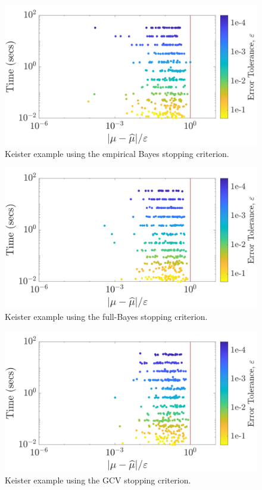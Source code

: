 \documentclass[graybox,footinfo]{svmult}
\begin{document}
\begin{figure}
\centering
\includegraphics[width=0.95\linewidth]{"figures/Sobol/Sobol_Keister_guaranteed_time_MLE__d4_r1_2019-Sep-1"}
\caption[Sobol: Keister guaranteed: MLE]{Keister example using the empirical Bayes stopping criterion.}
\label{fig:Sobol-keister-guaranteed-MLE}
\end{figure}
\begin{figure}
\centering
\includegraphics[width=0.95\linewidth]{"figures/Sobol/Sobol_Keister_guaranteed_time_full__d4_r1_2019-Sep-1"}
\caption[Sobol: Keister guaranteed: Full Bayes]{Keister example using the full-Bayes stopping criterion.}
\label{fig:Sobol-keister-guaranteed-FB}
\end{figure}
\begin{figure}
\centering
\includegraphics[width=0.95\linewidth]{"figures/Sobol/Sobol_Keister_guaranteed_time_GCV__d4_r1_2019-Sep-1"}
\caption[Sobol: Keister guaranteed: GCV]{Keister example using the GCV stopping criterion.}
\label{fig:Sobol-keister-guaranteed-GCV}
\end{figure}
\end{document}
